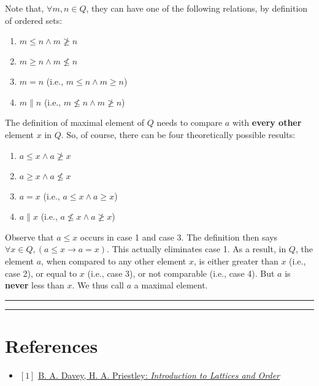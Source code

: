 \documentclass[12pt, letterpaper, oneside]{book}
\begin{document}
Note that, $\forall m, n \in Q$, they can have one of the following relations, by definition of ordered sets:
\begin{enumerate}
  \item $m \leqslant n \land m \ngeqslant n$
  \item $m \geqslant n \land m \nleqslant n$
  \item $m = n$ (i.e., $m \leqslant n \land m \geqslant n$)
  \item $m \parallel n$ (i.e., $m \nleqslant n \land m \ngeqslant n$)
\end{enumerate}

The definition of maximal element of $Q$ needs to compare $a$ with \textbf{every other} element $x$ in $Q$. So, of
course, there can be four theoretically possible results:
\begin{enumerate}
  \item $a \leqslant x \land a \ngeqslant x$
  \item $a \geqslant x \land a \nleqslant x$
  \item $a = x$ (i.e., $a \leqslant x \land a \geqslant x$)
  \item $a \parallel x$ (i.e., $a \nleqslant x \land a \ngeqslant x$)
\end{enumerate}

Observe that $a \leqslant x$ occurs in case 1 and case 3. The definition then says $\forall x \in Q, (a \leqslant x
  \rightarrow a = x)$. This actually eliminates case 1. As a result, in $Q$, the element $a$, when compared to any other
element $x$, is either greater than $x$ (i.e., case 2), or equal to $x$ (i.e., case 3), or not comparable (i.e., case
4). But $a$ is \textbf{never} less than $x$. We thus call $a$ a maximal element.

\noindent\rule{10cm}{0.4pt}\rule{1cm}{10pt}

%
%

\chapter*{References}

\begin{itemize}
  \item $[1]$ \href{https://www.cambridge.org/core/books/introduction-to-lattices-and-order/946458CB6638AF86D85BA00F5787F4F4}{B. A. Davey, H. A. Priestley: \it{Introduction to Lattices and Order}}
\end{itemize}
\end{document}
